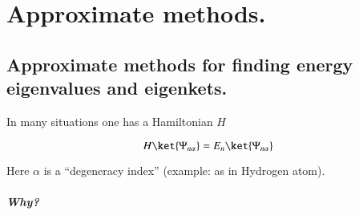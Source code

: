 %
%

\chapter{Approximate methods.}
\label{chap:qmTwoL2}
{}
\date{Sept 12, 2011}

\beginArtWithToc

\section{Approximate methods for finding energy eigenvalues and eigenkets.}

In many situations one has a Hamiltonian $H$

\begin{equation}\label{eqn:qmTwoL2:10}
H \ket{\Psi_{n \alpha}} = E_n \ket{\Psi_{n \alpha}}
\end{equation}

Here $\alpha$ is a ``degeneracy index'' (example: as in Hydrogen atom).

\paragraph{Why?}

